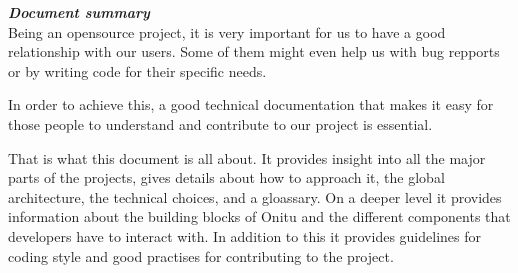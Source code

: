 \thispagestyle{empty}
\vspace*{10mm}

\textbf{\emph{\textcolor{onitu}{\large{Document summary} } } }\\

Being an opensource project, it is very important for us to have a good relationship with our users. Some of them might even help us with bug repports or by writing code for their specific needs.

In order to achieve this, a good technical documentation that makes it easy for those people to understand and contribute to our project is essential.

That is what this document is all about. It provides insight into all the major parts of the projects, gives details about how to approach it, the global architecture, the technical choices, and a gloassary. On a deeper level it provides information about the building blocks of Onitu and the different components that developers have to interact with. In addition to this it provides guidelines for coding style and good practises for contributing to the project.

\clearpage

